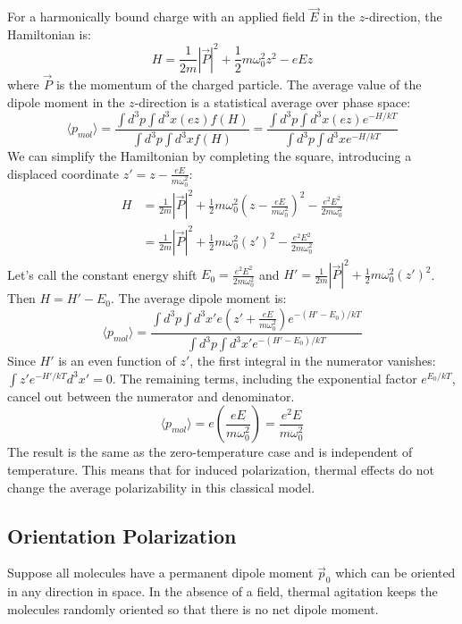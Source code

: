 \documentclass{article}
\begin{document}
	For a harmonically bound charge with an applied field $\vec{E}$ in the $z$-direction, the Hamiltonian is:
	\[
	H = \frac{1}{2m} |\vec{P}|^2 + \frac{1}{2} m\omega_0^2 z^2 - eEz
	\]
	where $\vec{P}$ is the momentum of the charged particle. The average value of the dipole moment in the $z$-direction is a statistical average over phase space:
	\[
	\langle p_{mol} \rangle = \frac{\int d^3p \int d^3x (ez) f(H)}{\int d^3p \int d^3x f(H)} = \frac{\int d^3p \int d^3x (ez) e^{-H/kT}}{\int d^3p \int d^3x e^{-H/kT}}
	\]
	We can simplify the Hamiltonian by completing the square, introducing a displaced coordinate $z' = z - \frac{eE}{m\omega_0^2}$:
	\begin{align*}
		H &= \frac{1}{2m} |\vec{P}|^2 + \frac{1}{2} m\omega_0^2 \left( z - \frac{eE}{m\omega_0^2} \right)^2 - \frac{e^2E^2}{2m\omega_0^2} \\
		&= \frac{1}{2m} |\vec{P}|^2 + \frac{1}{2} m\omega_0^2 (z')^2 - \frac{e^2E^2}{2m\omega_0^2}
	\end{align*}
	Let's call the constant energy shift $E_0 = \frac{e^2E^2}{2m\omega_0^2}$ and $H' = \frac{1}{2m} |\vec{P}|^2 + \frac{1}{2} m\omega_0^2 (z')^2$. Then $H = H' - E_0$.
	The average dipole moment is:
	\[
	\langle p_{mol} \rangle = \frac{\int d^3p \int d^3x' e(z' + \frac{eE}{m\omega_0^2}) e^{-(H'-E_0)/kT}}{\int d^3p \int d^3x' e^{-(H'-E_0)/kT}}
	\]
	Since $H'$ is an even function of $z'$, the first integral in the numerator vanishes: $\int z' e^{-H'/kT} d^3x' = 0$.
	The remaining terms, including the exponential factor $e^{E_0/kT}$, cancel out between the numerator and denominator.
	\[
	\langle p_{mol} \rangle = e \left( \frac{eE}{m\omega_0^2} \right) = \frac{e^2E}{m\omega_0^2}
	\]
	The result is the same as the zero-temperature case and is independent of temperature. This means that for induced polarization, thermal effects do not change the average polarizability in this classical model.
	
	\subsection{Orientation Polarization}
	Suppose all molecules have a permanent dipole moment $\vec{p}_0$ which can be oriented in any direction in space. In the absence of a field, thermal agitation keeps the molecules randomly oriented so that there is no net dipole moment.
	
\end{document}
